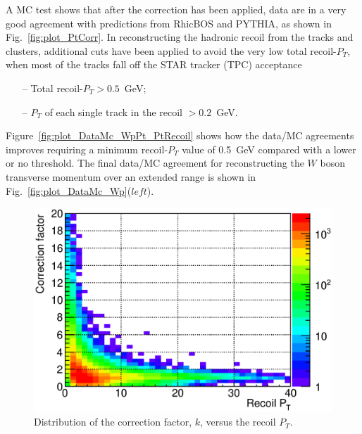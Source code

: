 \documentclass[12pt]{article}
\begin{document}
A MC test shows that after the correction has been applied, data are in a very good agreement with predictions from RhicBOS and PYTHIA, as shown in Fig.~\ref{fig:plot_PtCorr}. In reconstructing the hadronic recoil from the tracks and clusters, additional cuts have been applied to avoid the very low total recoil-$P_{T}$, when most of the tracks fall off the STAR tracker (TPC) acceptance 
\begin{itemize}
   \item[--] Total recoil-$P_{T} > 0.5$~GeV; 
    \item[--] $P_{T}$ of each single track in the recoil $> 0.2$~GeV. 
\end{itemize}
Figure~\ref{fig:plot_DataMc_WpPt_PtRecoil} shows how the data/MC agreements improves requiring a minimum recoil-$P_{T}$ value of 0.5~GeV compared with a lower or no threshold.
The final data/MC agreement for reconstructing the $W$ boson transverse momentum over an extended range is  shown in Fig.~\ref{fig:plot_DataMc_Wp}($left$).

\begin{figure}[htbp]
\begin{center}
\includegraphics[scale=0.8]{images/plot_PtCorrFactor}
\end{center}
\caption{Distribution of the correction factor, $k$, versus the recoil $P_{T}$.}
\label{fig:plot_PtCorrFactor} 
\end{figure}
\end{document}

